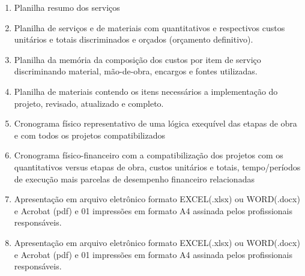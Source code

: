 \begin{enumerate}
	\item Planilha resumo dos serviços
	
	\item Planilha de serviços e de materiais com quantitativos e respectivos custos unitários e totais discriminados e orçados (orçamento definitivo).
	
	\item Planilha da memória da composição dos custos por item de serviço discriminando material, mão-de-obra, encargos e fontes utilizadas.
	
	\item Planilha de materiais contendo os itens necessários a implementação do projeto, revisado, atualizado e completo.
	
	\item Cronograma físico representativo de uma lógica exequível das etapas de obra e com todos os projetos compatibilizados
	
	\item Cronograma físico-financeiro com a compatibilização dos projetos com os quantitativos versus etapas de obra, custos unitários e totais, tempo/períodos de execução mais parcelas de desempenho financeiro relacionadas
	
	\item Apresentação em arquivo eletrônico formato EXCEL(.xlsx) ou WORD(.docx) e Acrobat (pdf) e 01 impressões em formato A4 assinada pelos profissionais responsáveis.

	\item Apresentação em arquivo eletrônico formato EXCEL(.xlsx) ou WORD(.docx) e Acrobat (pdf) e 01 impressões em formato A4 assinada pelos profissionais responsáveis.

\end{enumerate}

